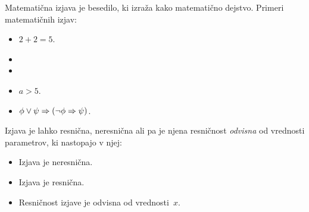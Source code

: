 Matematična izjava je besedilo, ki izraža kako matematično dejstvo. Primeri matematičnih izjav:
%
\begin{itemize}
\item $2 + 2 = 5$.
\item {}
\item {}
\item $a > 5$.
\item $\phi \lor \psi \Rightarrow (\lnot \phi \Rightarrow \psi)$.
\end{itemize}
%
Izjava je lahko resnična, neresnična ali pa je njena resničnost
\emph{odvisna} od vrednosti parametrov, ki nastopajo v njej:
%
\begin{itemize}
\item Izjava  je neresnična.
\item Izjava  je resnična.
\item Resničnost izjave  je odvisna od vrednosti~$x$.
\end{itemize}
%

